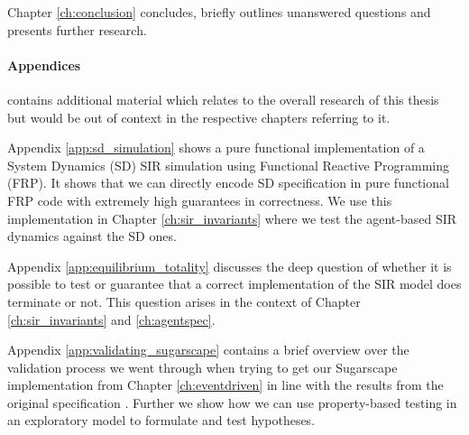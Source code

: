 \medskip

Chapter \ref{ch:conclusion} concludes, briefly outlines unanswered questions and presents further research.

\paragraph{Appendices} contains additional material which relates to the overall research of this thesis but would be out of context in the respective chapters referring to it.
\medskip

Appendix \ref{app:sd_simulation} shows a pure functional implementation of a System Dynamics (SD) SIR simulation using Functional Reactive Programming (FRP). It shows that we can directly encode SD specification in pure functional FRP code with extremely high guarantees in correctness. We use this implementation in Chapter \ref{ch:sir_invariants} where we test the agent-based SIR dynamics against the SD ones.

\medskip

Appendix \ref{app:equilibrium_totality} discusses the deep question of whether it is possible to test or guarantee that a correct implementation of the SIR model does terminate or not. This question arises in the context of Chapter \ref{ch:sir_invariants} and \ref{ch:agentspec}.

\medskip

Appendix \ref{app:validating_sugarscape} contains a brief overview over the validation process we went through when trying to get our Sugarscape implementation from Chapter \ref{ch:eventdriven} in line with the results from the original specification \cite{epstein_growing_1996}. Further we show how we can use property-based testing in an exploratory model to formulate and test hypotheses.
